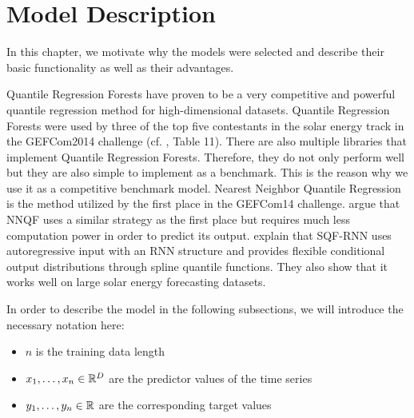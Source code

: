 \chapter{Model Description}
\label{ch:model-description}

In this chapter, we motivate why the models were selected and 
describe their basic functionality as well as their advantages.

Quantile Regression Forests have proven to be a very competitive 
and powerful quantile regression method for high-dimensional datasets. 
Quantile Regression Forests were used by three of the top five contestants 
in the solar energy track in the GEFCom2014 challenge (cf. \Textcite{Hong2016}, Table 11). 
There are also multiple libraries that implement Quantile Regression Forests.
Therefore, they do not only perform 
well but they are also simple to implement as a benchmark.
This is the reason why we use it as a competitive benchmark model.
Nearest Neighbor Quantile Regression is the method utilized by the first place 
in the GEFCom14 challenge. \Textcite{Ordiano2019} argue that NNQF 
uses a similar strategy as the first place but requires much less 
computation power in order to predict its output. 
\Textcite{Gasthaus2019} explain that SQF-RNN uses autoregressive input with an RNN structure and provides flexible 
conditional output distributions through spline quantile functions. 
They also show that it works well on large solar energy 
forecasting datasets.

In order to describe the model in the following subsections, we will introduce the necessary notation here:
\begin{itemize}
    \item \(n\) is the training data length
    \item \(x_1, \ldots, x_n \in \mathbb{R}^D\) are the predictor values of the time series
    \item \(y_1, \ldots, y_n \in \mathbb{R}\) are the corresponding target values
\end{itemize}






